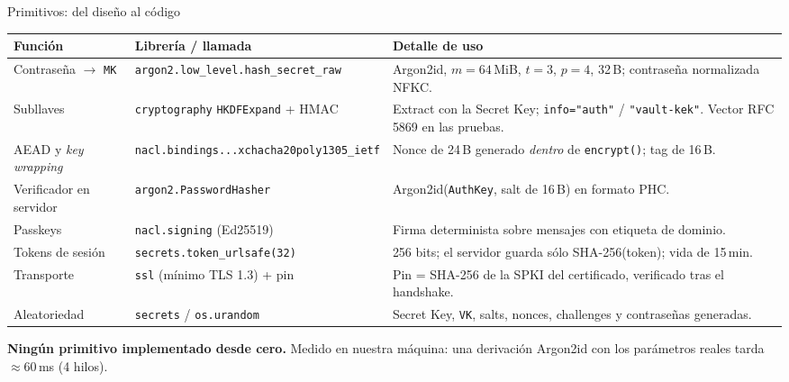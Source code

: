 \documentclass[aspectratio=169,10pt]{beamer}
\newcommand{\key}[1]{\textcolor{cripto}{\texttt{#1}}}
\newcommand{\code}[1]{\texttt{\footnotesize #1}}
\begin{document}
\begin{frame}{Primitivos: del diseño al código}
  \centering\scriptsize
  \renewcommand{\arraystretch}{0.9}
  \setlength{\tabcolsep}{3pt}
  \begin{tabular}{@{}p{} p{} p{}@{}}
    \toprule
    \textbf{Función} & \textbf{Librería / llamada} & \textbf{Detalle de uso} \\
    \midrule
    Contraseña $\to$ \key{MK}
      & \code{argon2.low\_level.hash\_secret\_raw}
      & Argon2id, $m{=}64$\,MiB, $t{=}3$, $p{=}4$, 32\,B; contraseña normalizada NFKC. \\
    \addlinespace[1pt]
    Subllaves
      & \code{cryptography} \code{HKDFExpand} + HMAC
      & Extract con la Secret Key; \texttt{info="auth"} / \texttt{"vault-kek"}. Vector RFC 5869 en las pruebas. \\
    \addlinespace[1pt]
    AEAD y \emph{key wrapping}
      & \code{nacl.bindings...xchacha20poly1305\_ietf}
      & Nonce de 24\,B generado \emph{dentro} de \code{encrypt()}; tag de 16\,B. \\
    \addlinespace[1pt]
    Verificador en servidor
      & \code{argon2.PasswordHasher}
      & Argon2id(\key{AuthKey}, salt de 16\,B) en formato PHC. \\
    \addlinespace[1pt]
    Passkeys
      & \code{nacl.signing} (Ed25519)
      & Firma determinista sobre mensajes con etiqueta de dominio. \\
    \addlinespace[1pt]
    Tokens de sesión
      & \code{secrets.token\_urlsafe(32)}
      & 256 bits; el servidor guarda sólo SHA-256(token); vida de 15\,min. \\
    \addlinespace[1pt]
    Transporte
      & \code{ssl} (mínimo TLS 1.3) + pin
      & Pin = SHA-256 de la SPKI del certificado, verificado tras el handshake. \\
    \addlinespace[1pt]
    Aleatoriedad
      & \code{secrets} / \code{os.urandom}
      & Secret Key, \key{VK}, salts, nonces, challenges y contraseñas generadas. \\
    \bottomrule
  \end{tabular}

  \vspace{2mm}
  {\scriptsize \textbf{Ningún primitivo implementado desde cero.} Medido en nuestra máquina:
  una derivación Argon2id con los parámetros reales tarda $\approx$60\,ms (4 hilos).}
\end{frame}
\end{document}
